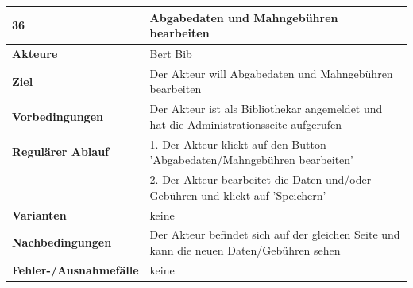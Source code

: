 \documentclass[fontsize=12pt,paper=a4,twoside]{scrartcl}
\begin{document}
\begin{table}[htbp]
\label{36}
\begin{tabular}{|l|p{10cm}|}
\hline 
\textbf{36} & \textbf{Abgabedaten und Mahngebühren bearbeiten} \\ \hline
\textbf{Akteure} & Bert Bib\\ \hline
\textbf{Ziel} & Der Akteur will Abgabedaten und Mahngebühren bearbeiten \\ \hline
\textbf{Vorbedingungen} & Der Akteur ist als Bibliothekar angemeldet und hat die Administrationsseite 
aufgerufen \\ \hline
\textbf{Regulärer Ablauf} & 
1. Der Akteur klickt auf den Button 'Abgabedaten/Mahngebühren bearbeiten' \\
&2. Der Akteur bearbeitet die Daten und/oder Gebühren und klickt auf 'Speichern'\\
\hline
\textbf{Varianten} & 
keine \\ \hline
\textbf{Nachbedingungen} & Der Akteur befindet sich auf der gleichen Seite und kann die neuen 
Daten/Gebühren sehen\\ \hline
\textbf{Fehler-/Ausnahmefälle} & keine\\
\hline
\end{tabular}
\end{table}

\newpage
\end{document}
